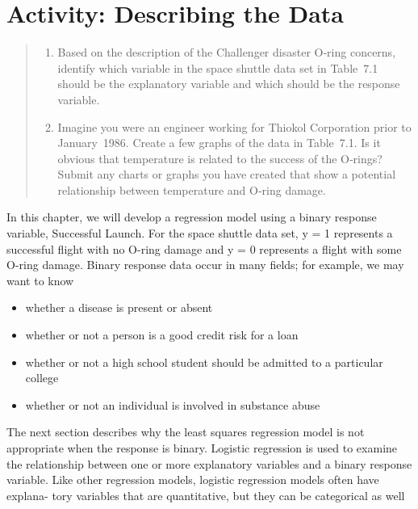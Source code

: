 \documentclass[
]{report}
\providecommand{\tightlist}{%
  \setlength{\itemsep}{0pt}\setlength{\parskip}{0pt}}
\begin{document}
\hypertarget{activity-describing-the-data-2}{%
\section*{Activity: Describing the Data}\label{activity-describing-the-data-2}}

\begin{quote}
\begin{enumerate}
\def\labelenumi{\arabic{enumi}.}
\tightlist
\item
  Based on the description of the Challenger disaster O‑ring concerns, identify which variable in the space shuttle data set in Table~7.1 should be the explanatory variable and which should be the response variable.\\
\item
  Imagine you were an engineer working for Thiokol Corporation prior to January~1986. Create a few graphs of the data in Table~7.1. Is it obvious that temperature is related to the success of the O‑rings? Submit any charts or graphs you have created that show a potential relationship between temperature and O‑ring damage.
\end{enumerate}
\end{quote}

In this chapter, we will develop a regression model using a binary response variable, Successful Launch. For
the space shuttle data set, y = 1 represents a successful flight with no O-ring damage and y = 0 represents a
flight with some O-ring damage. Binary response data occur in many fields; for example, we may want to know

\begin{itemize}
\tightlist
\item
  whether a disease is present or absent
\item
  whether or not a person is a good credit risk for a loan
\item
  whether or not a high school student should be admitted to a particular college
\item
  whether or not an individual is involved in substance abuse
\end{itemize}

The next section describes why the least squares regression model is not appropriate when the response is
binary. Logistic regression is used to examine the relationship between one or more explanatory variables
and a binary response variable. Like other regression models, logistic regression models often have explana-
tory variables that are quantitative, but they can be categorical as well
\end{document}
